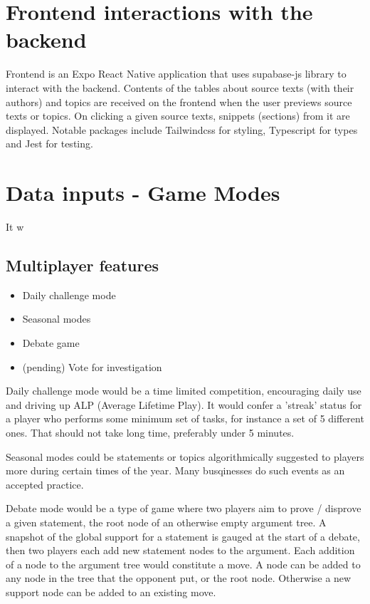 \documentclass{report}
\begin{document}
{\section{Frontend interactions with the backend}

Frontend is an Expo \cite{noauthor_dashboard_nodate} React Native application that uses supabase-js library to interact with the backend.
Contents of the tables about source texts (with their authors) and topics are received on the frontend when the user previews source texts or topics. On clicking a given source texts, snippets (sections) from it are displayed.
Notable packages include Tailwindcss for styling, Typescript for types and Jest for testing. 

\section{Data inputs - Game Modes}
It w
\subsection{Multiplayer features}
\begin{itemize}
  \item Daily challenge mode
  \item Seasonal modes
  \item Debate game
  \item (pending) Vote for investigation
\end{itemize}
Daily challenge mode would be a time limited competition, encouraging daily use and driving up ALP (Average Lifetime Play). It would confer a 'streak' status for a player who performs some minimum set of tasks, for instance a set of 5 different ones. That should not take long time, preferably under 5 minutes.

Seasonal modes could be statements or topics algorithmically suggested to players more during certain times of the year. Many busqinesses do such events as an accepted practice.

Debate mode would be a type of game where two players aim to prove / disprove a given statement, the root node of an otherwise empty argument tree.  A snapshot of the global support for a statement is gauged at the start of a debate, then two players each add new statement nodes to the argument. Each addition of a node to the argument tree would constitute a move.
A node can be added to any node in the tree that the opponent put, or the root node. Otherwise a new support node can be added to an existing move.

}
\end{document}
